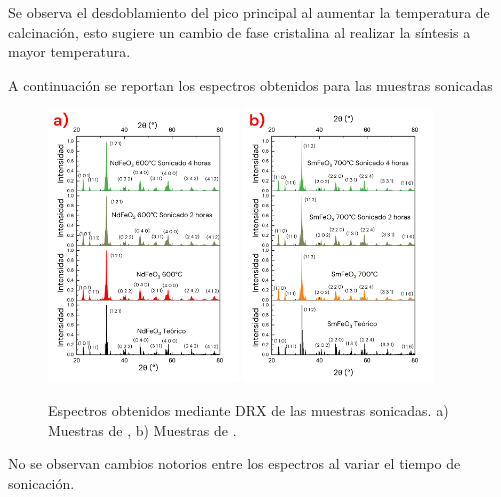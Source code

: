 \documentclass[../main.tex]{subfiles}
\begin{document}
Se observa el desdoblamiento del pico principal al aumentar la temperatura de calcinación, esto sugiere un cambio de fase cristalina al realizar la síntesis a mayor temperatura.

A continuación se reportan los espectros obtenidos para las muestras sonicadas
\begin{figure}[H]
    \centering
    \includegraphics[width=0.45\textwidth]{fig/drxsonicndfeo3.png}
    \quad
    \includegraphics[width=0.45\textwidth]{fig/drxsonicsmfeo3.png}
    \caption{Espectros obtenidos mediante DRX de las muestras sonicadas. a) Muestras de \neod{}, b) Muestras de \sama{}.}
    \label{fig:drxsoniccomp}
\end{figure}
No se observan cambios notorios entre los espectros al variar el tiempo de sonicación.
\end{document}
